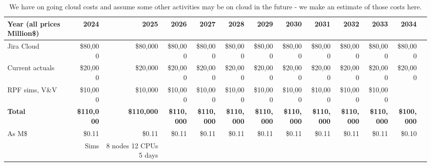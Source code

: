 \tiny \begin{longtable} { |p{}  |r  |r  |r  |r  |r  |r  |r  |r  |r  |r  |r  |r |}
\caption{We have on going cloud costs and assume some other activities may be on cloud in the future - we make an estimate of those costs here. \label{tab:cloud}}\\
\hline
\textbf{Year  (all prices Million\$)}&\textbf{2024}&\textbf{2025}&\textbf{2026}&\textbf{2027}&\textbf{2028}&\textbf{2029}&\textbf{2030}&\textbf{2031}&\textbf{2032}&\textbf{2033}&\textbf{2034} \\ \hline
{Jira Cloud}&{\$80,000}&{\$80,000}&{\$80,000}&{\$80,000}&{\$80,000}&{\$80,000}&{\$80,000}&{\$80,000}&{\$80,000}&{\$80,000}&{\$80,000} \\ \hline
{Current actuals}&{\$20,000}&{\$20,000}&{\$20,000}&{\$20,000}&{\$20,000}&{\$20,000}&{\$20,000}&{\$20,000}&{\$20,000}&{\$20,000}&{\$20,000} \\ \hline
{RPF sims, V\&V}&{\$10,000}&{\$10,000}&{\$10,000}&{\$10,000}&{\$10,000}&{\$10,000}&{\$10,000}&{\$10,000}&{\$10,000}&{\$10,000}& \\ \hline
\textbf{Total}&\textbf{\$110,000}&\textbf{\$110,000}&\textbf{\$110,000}&\textbf{\$110,000}&\textbf{\$110,000}&\textbf{\$110,000}&\textbf{\$110,000}&\textbf{\$110,000}&\textbf{\$110,000}&\textbf{\$110,000}&\textbf{\$100,000} \\ \hline
{As M\$}&{\$0.11}&{\$0.11}&{\$0.11}&{\$0.11}&{\$0.11}&{\$0.11}&{\$0.11}&{\$0.11}&{\$0.11}&{\$0.11}&{\$0.10} \\ \hline
{}&{Sims }&{8 nodes 12 CPUs 5 days}&&&&&&&&& \\ \hline
\end{longtable} \normalsize
